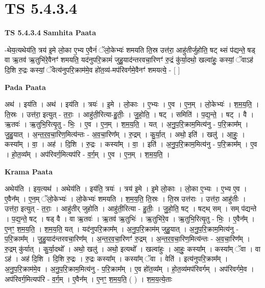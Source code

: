 \documentclass[17pt]{extarticle}
\begin{document}
\section{ TS 5.4.3.4 }

\textbf{TS 5.4.3.4 } \newline
\textbf{Samhita Paata} \newline

-थेय॒त्यथेय॑ति॒ त्रय॑ इ॒मे लो॒का ए॒भ्य ए॒वैनं॑ ॅलो॒केभ्यः॑ शमयति ति॒स्र उत्त॑रा॒ आहु॑तीर्जुहोति॒ षट् थ्सं प॑द्यन्ते॒ षड् वा ऋ॒तव॑ ऋ॒तुभि॑रे॒वैनꣳ॑ शमयति॒ यद॑नुपरि॒क्रामं॑ जुहु॒याद॑न्तरवचा॒रिणꣳ॑ रु॒द्रं कु॑र्या॒दथो॒ खल्वा॑हुः॒ कस्यां॒ ॅवाऽह॑ दि॒शि रु॒द्रः कस्यां॒ ॅवेत्य॑नुपरि॒क्राम॑मे॒व हो॑त॒व्य॑-मप॑रिवर्गमे॒वैनꣳ॑ शमयत्ये॒ - [  ] \newline

\textbf{Pada Paata} \newline

अथ॑ । इय॑ति । अथ॑ । इय॑ति । त्रयः॑ । इ॒मे । लो॒काः । ए॒भ्यः । ए॒व । ए॒न॒म् । लो॒केभ्यः॑ । श॒म॒य॒ति॒ । ति॒स्रः । उत्त॑रा॒ इत्युत् - त॒राः॒ । आहु॑ती॒रित्या-हु॒तीः॒ । जु॒हो॒ति॒ । षट् । समिति॑ । प॒द्य॒न्ते॒ । षट् । वै । ऋ॒तवः॑ । ऋ॒तुभि॒रित्यृ॒तु - भिः॒ । ए॒व । ए॒न॒म् । श॒म॒य॒ति॒ । यत् । अ॒नु॒प॒रि॒क्राम॒मित्य॑नु - प॒रि॒क्राम᳚म् । जु॒हु॒यात् । अ॒न्त॒र॒व॒चा॒रिण॒मित्य॑न्तः - अ॒व॒चा॒रिण᳚म् । रु॒द्रम् । कु॒र्या॒त् । अथो॒ इति॑ । खलु॑ । आ॒हुः॒ । कस्या᳚म् । वा॒ । अह॑ । दि॒शि । रु॒द्रः । कस्या᳚म् । वा॒ । इति॑ । अ॒नु॒प॒रि॒क्राम॒मित्य॑नु - प॒रि॒क्राम᳚म् । ए॒व । हो॒त॒व्य᳚म् । अप॑रिवर्ग॒मित्यप॑रि - व॒र्ग॒म् । ए॒व । ए॒न॒म् । श॒म॒य॒ति॒ ।  \newline


\textbf{Krama Paata} \newline

अथेय॑ति । इय॒त्यथ॑ । अथेय॑ति । इय॑ति॒ त्रयः॑ । त्रय॑ इ॒मे । इ॒मे लो॒काः । लो॒का ए॒भ्यः । ए॒भ्य ए॒व । ए॒वैन᳚म् । ए॒न॒म् ॅलो॒केभ्यः॑ । लो॒केभ्यः॑ शमयति । श॒म॒य॒ति॒ ति॒स्रः । ति॒स्र उत्त॑राः । उत्त॑रा॒ आहु॑तीः । उत्त॑रा॒ इत्युत् - त॒राः॒ । आहु॑तीर् जुहोति । आहु॑ती॒रित्या - हु॒तीः॒ । जु॒हो॒ति॒ षट् । षट्थ् सम् । सम् प॑द्यन्ते । प॒द्य॒न्ते॒ षट् । षड् वै । वा ऋ॒तवः॑ । ऋ॒तव॑ ऋ॒तुभिः॑ । ऋ॒तुभि॑रे॒व । ऋ॒तुभि॒रित्यृ॒तु - भिः॒ । ए॒वैन᳚म् । ए॒नꣳ॒॒ श॒म॒य॒ति॒ । श॒म॒य॒ति॒ यत् । यद॑नुपरि॒क्राम᳚म् । अ॒नु॒प॒रि॒क्राम॑म् जुहु॒यात् । अ॒नु॒प॒रि॒क्राम॒मित्य॑नु - प॒रि॒क्राम᳚म् । जु॒हु॒याद॑न्तरवचा॒रिण᳚म् । अ॒न्त॒र॒व॒चा॒रिणꣳ॑ रु॒द्रम् । अ॒न्त॒र॒व॒चा॒रिण॒मित्य॑न्तः - अ॒व॒चा॒रिण᳚म् । रु॒द्रम् कु॑र्यात् । कु॒र्या॒दथो᳚ । अथो॒ खलु॑ । अथो॒ इत्यथो᳚ । खल्वा॑हुः । आ॒हुः॒ कस्या᳚म् । कस्या᳚म् ॅवा । वा ऽह॑ । अह॑ दि॒शि । दि॒शि रु॒द्रः । रु॒द्रः कस्या᳚म् । कस्या᳚म् ॅवा । वेति॑ । इत्य॑नुपरि॒क्राम᳚म् । अ॒नु॒प॒रि॒क्राम॑मे॒व । अ॒नु॒प॒रि॒क्राम॒मित्य॑नु - प॒रि॒क्राम᳚म् । ए॒व हो॑त॒व्य᳚म् । हो॒त॒व्य॑मप॑रिवर्गम् । अप॑रिवर्गमे॒व । अप॑रिवर्ग॒मित्यप॑रि - व॒र्ग॒म् । ए॒वैन᳚म् । ए॒नꣳ॒॒ श॒म॒य॒ति॒ ( ) । श॒म॒य॒त्ये॒ताः \newline
\end{document}
